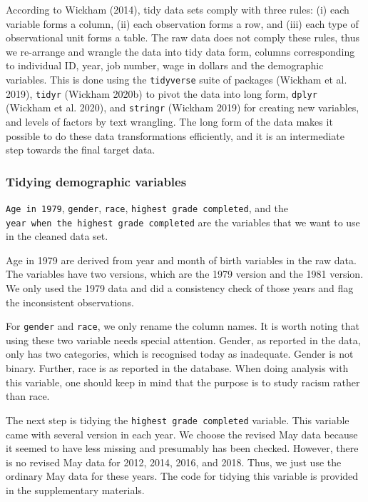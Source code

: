 \documentclass[12pt]{article}
\begin{document}
According to Wickham (2014), tidy data sets comply with three rules: (i) each variable forms a column, (ii) each observation forms a row, and (iii) each type of observational unit forms a table. The raw data does not comply these rules, thus we re-arrange and wrangle the data into tidy data form, columns corresponding to individual ID, year, job number, wage in dollars and the demographic variables. This is done using the \texttt{tidyverse} suite of packages (Wickham et al. 2019), \texttt{tidyr} (Wickham 2020b) to pivot the data into long form, \texttt{dplyr} (Wickham et al. 2020), and \texttt{stringr} (Wickham 2019) for creating new variables, and levels of factors by text wrangling. The long form of the data makes it possible to do these data transformations efficiently, and it is an intermediate step towards the final target data.

\hypertarget{tidydemog}{%
\subsubsection{Tidying demographic variables}\label{tidydemog}}

\texttt{Age\ in\ 1979}, \texttt{gender}, \texttt{race}, \texttt{highest\ grade\ completed}, and the \texttt{year\ when\ the\ highest\ grade\ completed} are the variables that we want to use in the cleaned data set.

Age in 1979 are derived from year and month of birth variables in the raw data. The variables have two versions, which are the 1979 version and the 1981 version. We only used the 1979 data and did a consistency check of those years and flag the inconsistent observations.

For \texttt{gender} and \texttt{race}, we only rename the column names. It is worth noting that using these two variable needs special attention. Gender, as reported in the data, only has two categories, which is recognised today as inadequate. Gender is not binary. Further, race is as reported in the database. When doing analysis with this variable, one should keep in mind that the purpose is to study racism rather than race.

The next step is tidying the \texttt{highest\ grade\ completed} variable. This variable came with several version in each year. We choose the revised May data because it seemed to have less missing and presumably has been checked. However, there is no revised May data for 2012, 2014, 2016, and 2018. Thus, we just use the ordinary May data for these years. The code for tidying this variable is provided in the supplementary materials.
\end{document}
